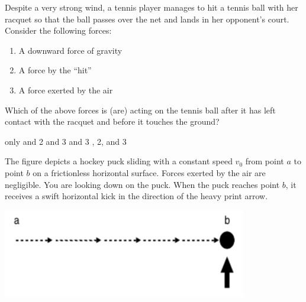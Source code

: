 \documentclass[12pt]{exam}
\begin{document}
\begin{questions}

\clearpage
\question
Despite a very strong wind, a tennis player manages to hit a tennis ball with her racquet so that the ball passes over the net and lands in her opponent's court. Consider the following forces:
\begin{enumerate}
\item A downward force of gravity
\item A force by the ``hit''
\item A force exerted by the air
\end{enumerate}
Which of the above forces is (are) acting on the tennis ball after it has left contact with the racquet and before it touches the ground?
\begin{choices}
 only
 and 2
 and 3
 and 3
, 2, and 3
\end{choices}

\question
The figure depicts a hockey puck sliding with a constant speed $v_0$ from point $a$ to point $b$ on a frictionless horizontal surface. Forces exerted by the air are negligible. You are looking down on the puck. When the puck reaches point $b$, it receives a swift horizontal kick in the direction of the heavy print arrow.
\begin{center}
\includegraphics[width=0.8\textwidth]{../images/FCI_puck1.png}
\end{center}
\end{questions}
\end{document}
